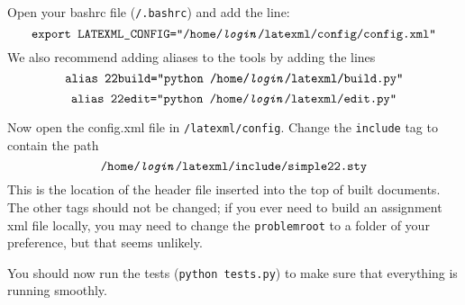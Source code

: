     Open your bashrc file (\texttt{\mytilde/.bashrc}) and add the line: \[\texttt{export LATEXML\_CONFIG=\ttquote /home/\textit{login}/latexml/config/config.xml\ttquote}\] We also recommend adding aliases to the tools by adding the lines \[\texttt{alias 22build=\ttquote python /home/\textit{login}/latexml/build.py\ttquote}\]\[\texttt{alias 22edit=\ttquote python /home/\textit{login}/latexml/edit.py\ttquote}\]
    
    Now open the config.xml file in \texttt{\mytilde/latexml/config}. Change the \texttt{include} tag to contain the path \[\texttt{/home/\textit{login}/latexml/include/simple22.sty}\] This is the location of the header file inserted into the top of built documents. The other tags should not be changed; if you ever need to build an assignment xml file locally, you may need to change the \texttt{problemroot} to a folder of your preference, but that seems unlikely.
    
    You should now run the tests (\texttt{python tests.py}) to make sure that everything is running smoothly.
    
